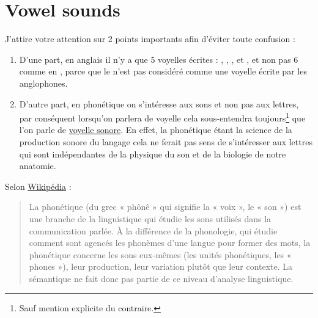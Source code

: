 \documentclass[12pt,a4paper, xetex, hyperref]{book}
\begin{document}
    \begin{savequote}[80mm]
    \end{savequote}

    

    
\part{Vowel sounds}\label{part:vow}

    
    J'attire votre attention sur 2 points importants afin d'éviter toute
    confusion :

    \begin{enumerate}
    \item D'une part, en anglais il n'y a que 5 voyelles écrites :
      , , ,  et , et non pas 6
      comme en , parce que le  n'est pas  considéré
      comme une voyelle écrite par les anglophones.
    \item D'autre part, en phonétique on s'intéresse aux sons et non pas aux
      lettres, par conséquent lorsqu'on parlera de voyelle cela
      sous-entendra toujours\footnote{Sauf mention explicite du
        contraire.} que l'on parle de \underline{voyelle sonore}. En
      effet, la phonétique étant la science de la production sonore du
      langage cela ne ferait pas sens de s'intéresser aux lettres qui sont
      indépendantes de la physique du son et de la biologie de notre anatomie.
    \end{enumerate}

    Selon
    \href{https://fr.wikipedia.org/wiki/Phon\%C3\%A9tique}{Wikipédia}
    :
    
    \begin{quote}
      La phonétique (du grec « phônê » qui signifie la « voix », le «
      son ») est une branche de la linguistique qui étudie les sons
      utilisés dans la communication parlée. À la différence de la
      phonologie, qui étudie comment sont agencés les phonèmes d'une
      langue pour former des mots, la phonétique concerne les sons
      eux-mêmes (les unités phonétiques, les « phones »), leur
      production, leur variation plutôt que leur contexte. La
      sémantique ne fait donc pas partie de ce niveau d'analyse linguistique.
    \end{quote}
\end{document}
